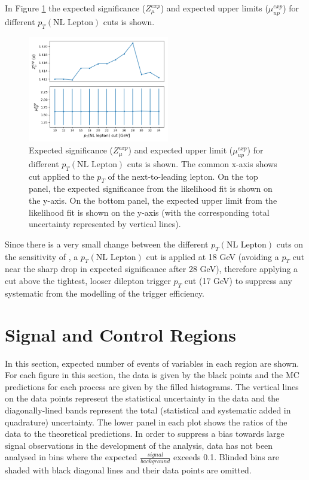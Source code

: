 In Figure \ref{fig:4lep-NLlep-optimization} the expected significance ($Z_{\mu}^{exp}$) and expected upper limits ($\mu_{up}^{exp}$) for different $p_{T}(\text{NL Lepton})$ cuts is shown.
\begin{figure}[h!]
	\includegraphics[width = 0.55\textwidth]{figures/NL_Lep_optimization.png}
  \centering
	\caption{Expected significance ($Z_{\mu}^{exp}$) and expected upper limit ($\mu_{up}^{exp}$) for different $p_{T}(\text{NL Lepton})$ cuts is shown. The common x-axis shows cut applied to the $p_{T}$ of the next-to-leading lepton. On the top panel, the expected significance from the likelihood fit is shown on the y-axis. On the bottom panel, the expected upper limit from the likelihood fit is shown on the y-axis (with the corresponding total uncertainty represented by vertical lines).}
	\label{fig:4lep-NLlep-optimization}
\end{figure}

Since there is a very small change between the different $p_{T}(\text{NL Lepton})$ cuts on the sensitivity of \tWZ, a $p_{T}(\text{NL Lepton})$ cut is applied at 18 GeV (avoiding a $p_{T}$ cut near the sharp drop in expected significance after 28 GeV), therefore applying a cut above the tightest, looser dilepton trigger $p_{T}$ cut (17 GeV) to suppress any systematic from the modelling of the trigger efficiency.

\section{Signal and Control Regions}

In this section, expected number of events of variables in each region are shown. For each figure in this section, the data is given by the black points and the MC predictions for each process are given by the filled histograms. The vertical lines on the data points represent the statistical uncertainty in the data and the diagonally-lined bands represent the total (statistical and systematic added in quadrature) uncertainty. The lower panel in each plot shows the ratios of the data to the theoretical predictions. In order to suppress a bias towards large signal observations in the development of the analysis, data has not been analysed in bins where the expected $\frac{signal}{background}$ exceeds 0.1. Blinded bins are shaded with black diagonal lines and their data points are omitted.\\

